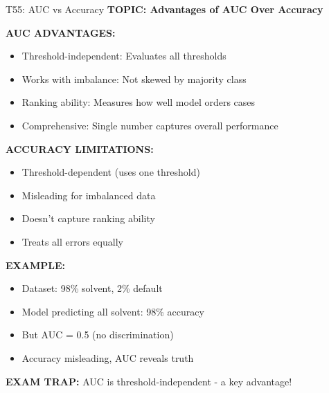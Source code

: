 \documentclass[8pt]{beamer}
\begin{document}
	\begin{frame}{T55: AUC vs Accuracy}
		\fontsize{6.5}{7.5}\selectfont
		\textbf{TOPIC: Advantages of AUC Over Accuracy}
		
		\vspace{0.1cm}
		\textbf{AUC ADVANTAGES:}
		\begin{itemize}
			\item \textcolor{myblue}{Threshold-independent:} Evaluates all thresholds
			\item \textcolor{myblue}{Works with imbalance:} Not skewed by majority class
			\item \textcolor{myblue}{Ranking ability:} Measures how well model orders cases
			\item \textcolor{myblue}{Comprehensive:} Single number captures overall performance
		\end{itemize}
		
		\vspace{0.1cm}
		\textbf{ACCURACY LIMITATIONS:}
		\begin{itemize}
			\item Threshold-dependent (uses one threshold)
			\item Misleading for imbalanced data
			\item Doesn't capture ranking ability
			\item Treats all errors equally
		\end{itemize}
		
		\vspace{0.1cm}
		\textbf{EXAMPLE:}
		\begin{itemize}
			\item Dataset: 98\% solvent, 2\% default
			\item Model predicting all solvent: 98\% accuracy
			\item But AUC = 0.5 (no discrimination)
			\item Accuracy misleading, AUC reveals truth
		\end{itemize}
		
		\textcolor{myred}{\textbf{EXAM TRAP:}} AUC is \textcolor{myblue}{threshold-independent} - a key advantage!
	\end{frame}
	
	
\end{document}
